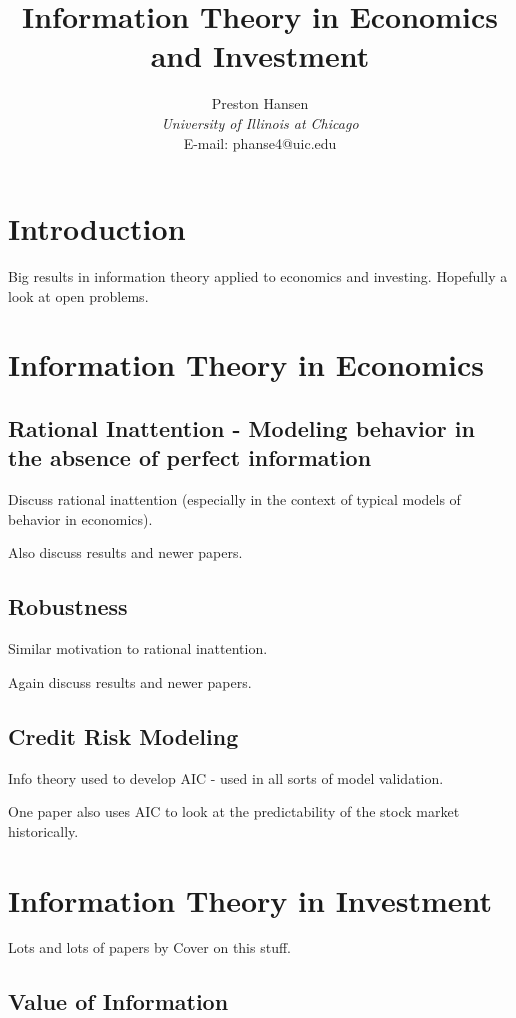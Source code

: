 \documentclass[10pt, twocolumn]{IEEEtran}
\begin{document}
\title{Information Theory in Economics and Investment}
\author{Preston Hansen\\
{\it University of Illinois at Chicago} \\
E-mail: phanse4@uic.edu}
\maketitle

\begin{abstract}
\end{abstract}

\section{Introduction}

Big results in information theory applied to economics and investing. Hopefully a look at open problems.

\section{Information Theory in Economics}

\subsection{Rational Inattention - Modeling behavior in the absence of perfect information}
Discuss rational inattention (especially in the context of typical models of behavior in economics).

Also discuss results and newer papers.
\subsection{Robustness}
Similar motivation to rational inattention.

Again discuss results and newer papers.
\subsection{Credit Risk Modeling}
Info theory used to develop AIC - used in all sorts of model validation.

One paper also uses AIC to look at the predictability of the stock market historically.
\section{Information Theory in Investment}
Lots and lots of papers by Cover on this stuff.
\subsection{Value of Information}
\end{document}
